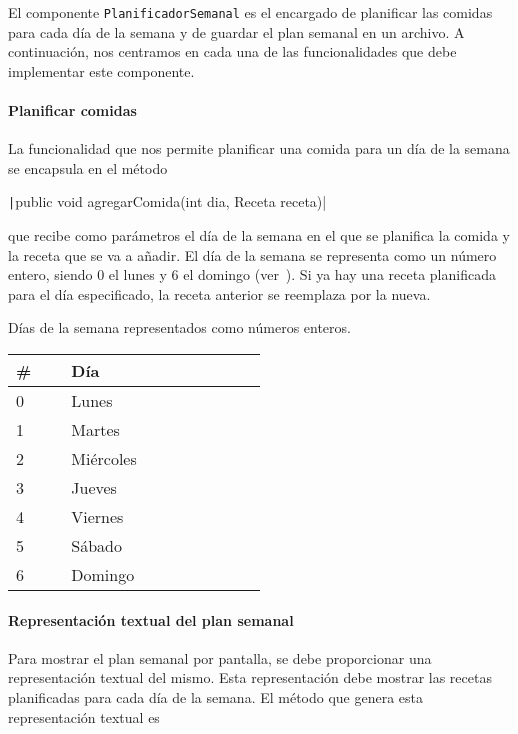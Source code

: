 \documentclass[
    a4paper, %
    12pt, %
]{CSSullivanBusinessReport}
\begin{document}
El componente \texttt{PlanificadorSemanal} es el encargado de planificar las comidas para cada día de la semana y de guardar el plan semanal en un archivo. A continuación, nos centramos en cada una de las funcionalidades que debe implementar este componente.

\paragraph{Planificar comidas}

La funcionalidad que nos permite planificar una comida para un día de la semana se encapsula en el método

\texttt|public void agregarComida(int dia, Receta receta)|

que recibe como parámetros el día de la semana en el que se planifica la comida y la receta que se va a añadir. El día de la semana se representa como un número entero, siendo 0 el lunes y 6 el domingo (ver~). Si ya hay una receta planificada para el día especificado, la receta anterior se reemplaza por la nueva.

\begin{margintable}
    \footnotesize
    \caption{Días de la semana representados como números enteros.}\label{tab:int-semana}
    \begin{tabular}{C{0.1\linewidth} L{0.4\linewidth}}
        \toprule
        \textbf{\#} & \textbf{Día}\\
         & Lunes\\
        1 & Martes\\
        2 & Miércoles\\
        3 & Jueves\\
        4 & Viernes\\
        5 & Sábado\\
        6 & Domingo\\
        \bottomrule
    \end{tabular}
\end{margintable}

\paragraph{Representación textual del plan semanal}

Para mostrar el plan semanal por pantalla, se debe proporcionar una representación textual del mismo. Esta representación debe mostrar las recetas planificadas para cada día de la semana. El método que genera esta representación textual es
\end{document}
